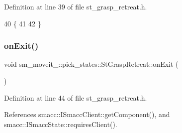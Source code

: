 Definition at line 39 of file st\+\_\+grasp\+\_\+retreat.\+h.


\begin{DoxyCode}
40     \{
41         
42     \}
\end{DoxyCode}
\mbox{\label{structsm__moveit__4_1_1pick__states_1_1StGraspRetreat_aba04f694c6c7c664a0c6a6e10c8ce0f1}} 
\subsubsection{\texorpdfstring{on\+Exit()}{onExit()}}
{\footnotesize\ttfamily void sm\+\_\+moveit\+\_\+::pick\+\_\+states\+::\+St\+Grasp\+Retreat\+::on\+Exit (\begin{DoxyParamCaption}{ }\end{DoxyParamCaption})\hspace{0.3cm}{\ttfamily [inline]}}



Definition at line 44 of file st\+\_\+grasp\+\_\+retreat.\+h.



References smacc\+::\+I\+Smacc\+Client\+::get\+Component(), and smacc\+::\+I\+Smacc\+State\+::requires\+Client().


